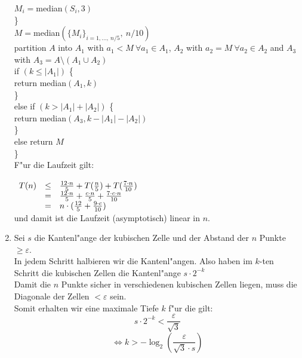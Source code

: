 \documentclass[a4paper,10pt]{scrartcl}
\begin{document}
\begin{enumerate}[1.]
    \hspace*{10 mm} $M_i = $median$(S_i,3)$\\
    \hspace*{5 mm}\}\\
    \hspace*{5 mm} $M = $median$(\{M_i\}_{i=1,\dots,~ n/5},~ n/10)$\\
    \hspace*{5 mm} partition $A$ into $A_1$ with $a_1 < M ~\forall{a_1 \in A_1}$, $A_2$ with $a_2 = M ~\forall{a_2 \in A_2}$ and $A_3$ with $A_3 = A \setminus (A_1 \cup A_2)$\\
    \hspace*{5 mm} if $(k \leq |A_1|)$ \{\\
    \hspace*{10 mm} return median$(A_1,k)$\\
    \hspace*{5 mm} \}\\
    \hspace*{5 mm} else if $(k > |A_1| + |A_2|)$ \{\\
    \hspace*{10 mm} return median$(A_3, k - |A_1| - |A_2|)$\\
    \hspace*{5 mm} \}\\
    \hspace*{5 mm} else return $M$\\
    \}\\
\newline
F"ur die Laufzeit gilt:\\
$\begin{array}{r c l}\\
T(n)& \leq & \frac{12\cdot n}{5} + T(\frac{n}{5}) + T(\frac{7\cdot n}{10})\\
& = & \frac{12\cdot n}{5} + \frac{c\cdot n}{5} + \frac{7\cdot c\cdot n}{10}\\
& = & n\cdot (\frac{12}{5} + \frac{9\cdot c}{10})\\
\end{array}$\\
und damit ist die Laufzeit (asymptotisch) linear in $n$.

\item Sei $s$ die Kantenl"ange der kubischen Zelle und der Abstand der $n$ Punkte $\geq \varepsilon$.\\
In jedem Schritt halbieren wir die Kantenl"angen. Also haben im $k$-ten Schritt die kubischen Zellen die Kantenl"ange $s \cdot 2^{-k}$\\
Damit die $n$ Punkte sicher in verschiedenen kubischen Zellen liegen, muss die Diagonale der Zellen $< \varepsilon$ sein.\\
Somit erhalten wir eine maximale Tiefe $k$ f"ur die gilt:
$$s \cdot 2^{-k} < \frac{\varepsilon}{\sqrt{3}}$$
$$\Leftrightarrow k > -\log_2{\left( \frac{\varepsilon}{\sqrt{3}\cdot s}\right)} $$


\end{enumerate}
\end{document}
